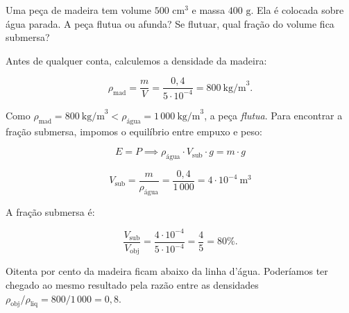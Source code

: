 \begin{exemplo}[Nível I]\label{exemplo_fluidos_empuxoex01}

Uma peça de madeira tem volume $500\text{ cm}^3$ e massa $400\text{ g}$. Ela é colocada sobre água parada. A peça flutua ou afunda? Se flutuar, qual fração do volume fica submersa?

\resolucao

Antes de qualquer conta, calculemos a densidade da madeira:
 
\begin{equation*}
    \rho_\text{mad} = \frac{m}{V} = \frac{0{,}4}{5\cdot 10^{-4}} = 800\ \text{kg/m}^3.
\end{equation*}
 
Como $\rho_\text{mad} = 800\ \text{kg/m}^3 < \rho_\text{água} = 1\,000\ \text{kg/m}^3$, a peça \textit{flutua}. Para encontrar a fração submersa, impomos o equilíbrio entre empuxo e peso:
 
\begin{equation*}
    E = P \implies \rho_\text{água} \cdot V_\text{sub} \cdot g = m \cdot g
\end{equation*}
 
\begin{equation*}
    V_\text{sub} = \frac{m}{\rho_\text{água}} = \frac{0{,}4}{1\,000} = 4 \cdot 10^{-4}\ \text{m}^3
\end{equation*}
 
A fração submersa é:
 
\begin{equation*}
    \frac{V_\text{sub}}{V_\text{obj}} = \frac{4\cdot10^{-4}}{5\cdot10^{-4}} = \frac{4}{5} = \boxed{80\%.}
\end{equation*}
 
Oitenta por cento da madeira ficam abaixo da linha d'água. Poderíamos ter chegado ao mesmo resultado pela razão entre as densidades $\rho_\text{obj}/\rho_\text{liq} = 800/1\,000 = 0{,}8$.

\end{exemplo}




\vspace{0.3cm}


